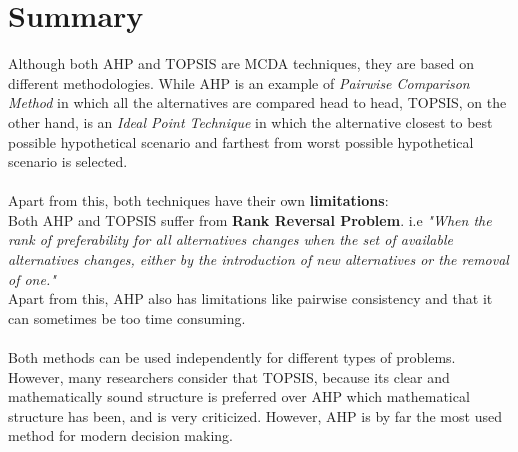 \documentclass[10pt, a4paper]{article}
\begin{document}
\section*{Summary}
Although both AHP and TOPSIS are MCDA techniques, they are based on different methodologies. While AHP is an example of \emph{Pairwise Comparison Method} in which all the alternatives are compared head to head, TOPSIS, on the other hand, is an \emph{Ideal Point Technique} in which the alternative closest to best possible hypothetical scenario and farthest from worst possible hypothetical scenario is selected.\\~\\
Apart from this, both techniques have their own \textbf{limitations}:\\
Both AHP and TOPSIS suffer from \textbf{Rank Reversal Problem}. i.e \textsl{"When the rank of preferability for all alternatives changes when the set of available alternatives changes, either by the introduction of new alternatives or the removal of one."} \\
Apart from this, AHP also has limitations like pairwise consistency and that it can sometimes be too time consuming.\\~\\
Both methods can be used independently for different types of problems. However, many researchers consider that TOPSIS, because its clear and mathematically sound structure is preferred over AHP which mathematical structure has been, and is very criticized. However, AHP is by far the most used method for modern decision making.
\end{document}
